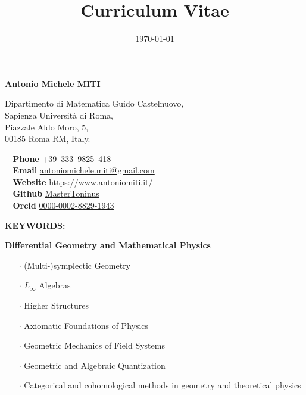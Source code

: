 \documentclass[a4paper]{article}
\title{Curriculum Vitae}
\author{\vspace{-1em}}
\date{\today}
\newcommand{\skill}[2]{\textbf{#1} \hfill #2 \\}
\begin{document}
\maketitle

	\vfill

	\begin{tcolorbox}
		\begin{center}
			\huge \textbf{Antonio Michele MITI}
		\end{center}
		\vspace{1em}

		\begin{minipage}[t]{0.45\columnwidth}
			Dipartimento di Matematica Guido Castelnuovo,\\
			Sapienza Università di Roma,\\
			Piazzale Aldo Moro, 5,\\
			00185 Roma RM, Italy.\\
		\end{minipage} 
		\hfill
		\begin{minipage}[t]{0.45\columnwidth}
			\skill{\faPhone~ Phone}{+39~333~9825~418}
			\skill{\faEnvelope~ Email}{\href{mailto:antoniomichele.miti@gmail.com}{antoniomichele.miti@gmail.com}}
			\skill{\faGlobe~ Website}{\href{https://www.antoniomiti.it/}{https://www.antoniomiti.it/}}
			\skill{\faGithubSquare ~ Github}{\href{https://github.com/MasterToninus}{MasterToninus}}
			\skill{~ Orcid}{\href{https://orcid.org/}{0000-0002-8829-1943}}   
		\end{minipage}
	\end{tcolorbox}

	\vfill
	
	\begin{tcolorbox}
		\begin{minipage}[t]{0.2\columnwidth}
			\textbf{KEYWORDS:}
		\end{minipage} 
		\hfill
		\begin{minipage}[t]{0.75\columnwidth}
			\textbf{Differential Geometry and Mathematical Physics}
		\begin{itemize}[leftmargin=*, itemsep=0pt, parsep=0pt, topsep=0pt, partopsep=0pt]
			\item[$\cdot$] (Multi-)symplectic Geometry
			\item[$\cdot$] $L_\infty$ Algebras
			\item[$\cdot$] Higher Structures
			\item[$\cdot$] Axiomatic Foundations of Physics
			\item[$\cdot$] Geometric Mechanics of Field Systems
			\item[$\cdot$] Geometric and Algebraic Quantization
			\item[$\cdot$] Categorical and cohomological methods in geometry and theoretical physics
		\end{itemize}
		\end{minipage}	
	\end{tcolorbox}
\end{document}
